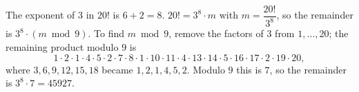 The exponent of $3$ in $20!$ is $6+2=8$. $20!=3^8\cdot m$ with $m=\dfrac{20!}{3^8}$, so the remainder is $3^8\cdot(m\bmod9)$. To find $m\bmod9$, remove the factors of $3$ from $1,\dots,20$; the remaining product modulo $9$ is
\[1\cdot2\cdot1\cdot4\cdot5\cdot2\cdot7\cdot8\cdot1\cdot10\cdot11\cdot4\cdot13\cdot14\cdot5\cdot16\cdot17\cdot2\cdot19\cdot20,\]
where $3,6,9,12,15,18$ became $1,2,1,4,5,2$. Modulo $9$ this is $7$, so the remainder is $3^8\cdot7=\boxed{45927}$.
